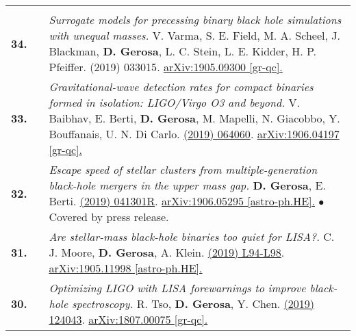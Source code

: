 {\begin{longtable}{rp{0.3cm}p{15.8cm}}
\vspace{0.09cm}\\
%
\textbf{34.} & & \textit{Surrogate models for precessing binary black hole simulations with unequal masses.}
\newline{}
V. Varma, S. E. Field, M. A. Scheel, J. Blackman, \textbf{D. Gerosa}, L. C. Stein, L. E. Kidder, H. P. Pfeiffer.
\newline{}
{\prr 1 (2019) 033015}. \href{https://arxiv.org/abs/1905.09300}{arXiv:1905.09300 [gr-qc].}
\vspace{0.09cm}\\
%
\textbf{33.} & & \textit{Gravitational-wave detection rates for compact binaries formed in isolation: LIGO/Virgo O3 and beyond.}
\newline{}
V. Baibhav, E. Berti, \textbf{D. Gerosa}, M. Mapelli, N. Giacobbo, Y. Bouffanais, U. N. Di Carlo.
\newline{}
\href{https://journals.aps.org/prd/abstract/10.1103/PhysRevD.100.064060}{\prd 100 (2019) 064060}. \href{https://arxiv.org/abs/1906.04197}{arXiv:1906.04197 [gr-qc].}
\vspace{0.09cm}\\
%
\textbf{32.} & & \textit{Escape speed of stellar clusters from multiple-generation black-hole mergers in the upper mass gap.}
\newline{}
\textbf{D. Gerosa}, E. Berti.
\newline{}
\href{https://journals.aps.org/prd/abstract/10.1103/PhysRevD.100.041301}{\prdrc 100 (2019) 041301R}. \href{https://arxiv.org/abs/1906.05295}{arXiv:1906.05295 [astro-ph.HE].}
\newline{}
\textcolor{color1}{$\bullet$} Covered by press release.
\vspace{0.09cm}\\
%
\textbf{31.} & & \textit{Are stellar-mass black-hole binaries too quiet for LISA?.}
\newline{}
C. J. Moore, \textbf{D. Gerosa}, A. Klein.
\newline{}
\href{https://doi.org/10.1093/mnrasl/slz104}{\mnrasl 488 (2019) L94-L98}. \href{https://arxiv.org/abs/1905.11998}{arXiv:1905.11998 [astro-ph.HE].}
\vspace{0.09cm}\\
%
\textbf{30.} & & \textit{Optimizing LIGO with LISA forewarnings to improve black-hole spectroscopy.}
\newline{}
R. Tso, \textbf{D. Gerosa}, Y. Chen.
\newline{}
\href{https://journals.aps.org/prd/abstract/10.1103/PhysRevD.99.124043}{\prd 99 (2019) 124043}. \href{https://arxiv.org/abs/1807.00075}{arXiv:1807.00075 [gr-qc].}

\end{longtable}}
